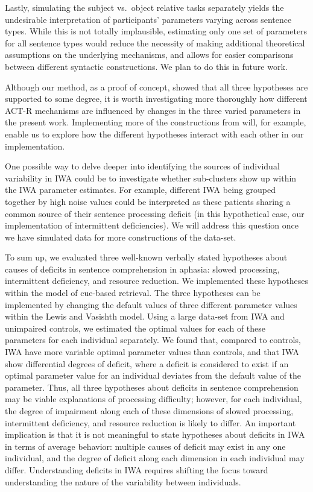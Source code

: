 \documentclass{cambridge7A}\usepackage[]{graphicx}\usepackage[]{color}
\begin{document}
Lastly, simulating the subject vs.\ object relative tasks separately yields the undesirable interpretation of participants' parameters varying across sentence types. While this is not totally implausible, estimating only one set of parameters for all sentence types would reduce the necessity of making additional theoretical assumptions on the underlying mechanisms, and allows for easier comparisons between different syntactic constructions.  We plan to do this in future work.

Although our method, as a proof of concept, showed that all three hypotheses are supported to some degree, it is worth investigating more thoroughly how different ACT-R mechanisms are influenced by changes in the three varied parameters in the present work. Implementing more of the constructions from \cite{CaplanEtAl2015} will, for example, enable us to explore how the different hypotheses interact with each other in our implementation. 

One possible way to delve deeper into identifying the sources of individual variability in IWA could be to investigate whether sub-clusters show up within the IWA parameter estimates.
For example, different IWA being grouped together by high noise values could be interpreted as these patients sharing a common source of their sentence processing deficit (in this hypothetical case, our implementation of intermittent deficiencies). We will address this question once we have simulated data for more constructions of the \cite{CaplanEtAl2015} data-set.



To sum up, we evaluated three well-known verbally stated hypotheses about causes of deficits in  sentence comprehension in aphasia: slowed processing, intermittent deficiency, and resource reduction. We implemented these hypotheses within the \cite{LewisVasishth2005} model of cue-based retrieval. The three hypotheses can be implemented by changing the default values of three different parameter values within the Lewis and Vasishth model. Using a large data-set from IWA and unimpaired controls, 
we estimated the optimal values for each of these parameters for each individual separately. We found that, compared to controls, IWA have more variable optimal parameter values than controls, and that IWA show differential degrees of deficit, where a deficit is considered to exist if an optimal parameter value for an individual  deviates from the default value of the parameter. Thus, all three hypotheses about deficits in sentence comprehension may be viable explanations of processing difficulty; however, for each individual, the degree of impairment along each of these dimensions of slowed processing, intermittent deficiency, and resource reduction is likely to differ. An important implication is that it is not meaningful to state hypotheses about deficits in IWA  in terms of average behavior: multiple causes of deficit may exist in any one individual, and the degree of deficit along each dimension in each individual may differ. Understanding deficits in IWA requires shifting the focus toward understanding the nature of the variability between individuals.
\end{document}
